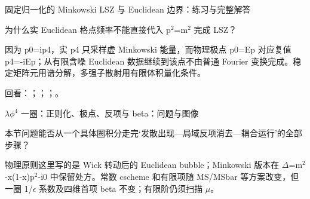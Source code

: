 \begin{frame}[t]{固定归一化的 Minkowski LSZ 与 Euclidean 边界：练习与完整解答}
\footnotesize
\begin{block}{}为什么实 Euclidean 格点频率不能直接代入 p\ensuremath{^{2}}=m\ensuremath{^{2}} 完成 LSZ？\end{block}
\begin{exampleblock}{}因为 p0=ip4，实 p4 只采样虚 Minkowski 能量，而物理极点 p0=Ep 对应复值 p4=-iEp；从有限含噪 Euclidean 数据继续到该点不由普通 Fourier 变换完成。稳定矩阵元用谱分解，多强子散射用有限体积量化条件。\end{exampleblock}
\vfill
\scriptsize 回看：；；；。
\end{frame}

\begin{frame}[t]{\ensuremath{\lambda}\ensuremath{\phi}\ensuremath{^{4}} 一圈：正则化、极点、反项与 beta：问题与图像}
\footnotesize
\begin{block}{本节问题}能否从一个具体圈积分走完‘发散出现—局域反项消去—耦合运行’的全部步骤？\end{block}
\begin{block}{物理原则}\quad 这里写的是 Wick 转动后的 Euclidean bubble；Minkowski 版本在 \ensuremath{\Delta}=m\ensuremath{^{2}}-x(1-x)p\ensuremath{^{2}}-i0 中保留处方。常数 cscheme 和有限项随 MS/\allowbreak{}MSbar 等方案改变，但一圈 1/\allowbreak{}\ensuremath{\epsilon} 系数及四维首项 beta 不变；有限阶仍须扫描 \ensuremath{\mu}。\end{block}
\end{frame}

